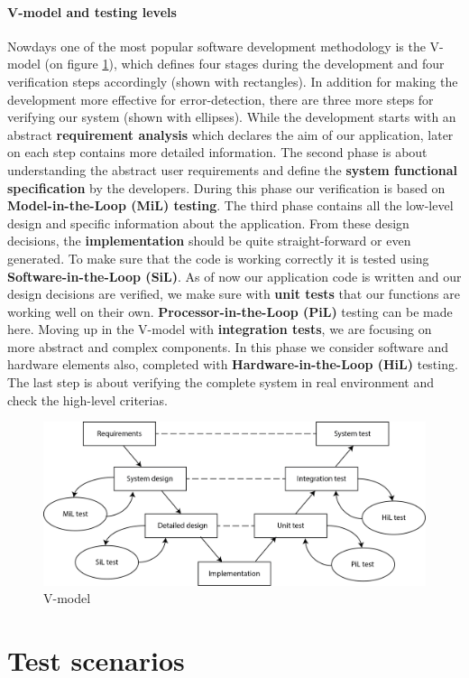 \paragraph{V-model and testing levels}
Nowdays one of the most popular software development methodology is the V-model (on figure \ref{fig:vModel}), which defines four stages during the development and four verification steps accordingly (shown with rectangles). In addition for making the development more effective for error-detection, there are three more steps for verifying our system (shown with ellipses). While the development starts with an abstract \textbf{requirement analysis} which declares the aim of our application, later on each step contains more detailed information. The second phase is about understanding the abstract user requirements and define the \textbf{system functional specification} by the developers. During this phase our verification is based on \textbf{Model-in-the-Loop (MiL) testing}. The third phase contains all the low-level design and specific information about the application. From these design decisions, the \textbf{implementation} should be quite straight-forward or even generated. To make sure that the code is working correctly it is tested using \textbf{Software-in-the-Loop (SiL)}. 
As of now our application code is written and our design decisions are verified, we make sure with \textbf{unit tests} that our functions are working well on their own. \textbf{Processor-in-the-Loop (PiL)} testing can be made here. Moving up in the V-model with \textbf{integration tests}, we are focusing on more abstract and complex components. In this phase we consider software and hardware elements also, completed with \textbf{Hardware-in-the-Loop (HiL)} testing. The last step is about verifying the complete system in real environment and check the high-level criterias.
\begin{figure}[!ht]
	\centering
	\includegraphics[width=150mm]{figures/modes3/v_model.png}
	\caption{V-model}
	\label{fig:vModel}
\end{figure}

\section{Test scenarios}
